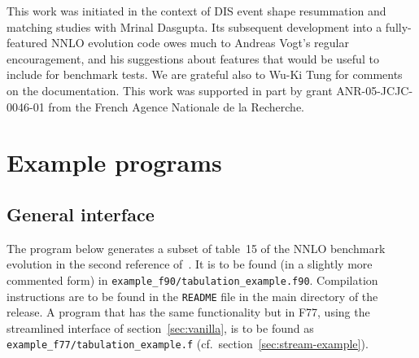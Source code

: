 \documentclass[12pt]{article}
\newcommand{\ttt}[1]{\texttt{#1}}
\begin{document}
This work was initiated in the context of DIS event shape resummation
and matching studies \cite{DisResum} with Mrinal Dasgupta. Its
subsequent development into a fully-featured NNLO evolution code owes
much to Andreas Vogt's regular encouragement, and his suggestions
about features that would be useful to include for benchmark tests.
We are grateful also to Wu-Ki Tung for comments on the documentation.
%
This work was supported in part by grant ANR-05-JCJC-0046-01 from the
French Agence Nationale de la Recherche. 

\appendix


\section{Example programs}
\label{sec:example_program}

\subsection{General interface}
\label{sec:example_gen}

The program below generates a subset of table~15 of the NNLO benchmark
evolution in the second reference of~\cite{Benchmarks}. It is to be
found (in a slightly more commented form) in
\ttt{example\_f90/tabulation\_example.f90}. Compilation instructions
are to be found in the \ttt{README} file in the main directory of the
release. A program that has the same functionality but in F77, using
the streamlined interface of section~\ref{sec:vanilla}, is to be found as
\ttt{example\_f77/tabulation\_example.f} (cf.\ section~\ref{sec:stream-example}).
\end{document}
